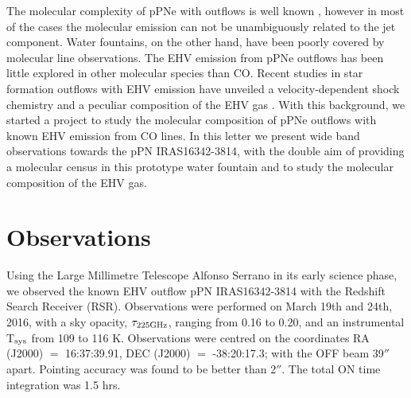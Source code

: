 \documentclass[a4paper,fleqn,usenatbib]{mnras}
\begin{document}
The molecular complexity of pPNe with outflows is well known \citep[e.g.][]{Sanchez97}, however in most of the cases the molecular emission can not be unambiguously related to the jet component. Water fountains, on the other hand, have been poorly covered by molecular line observations. The EHV emission from pPNe outflows has been little explored in other molecular species than CO. Recent studies in star formation outflows with EHV emission have unveiled a velocity-dependent shock chemistry and a peculiar composition of the EHV gas \citep{Tafalla10}. With this background, we started a project to study the molecular composition of pPNe outflows with known EHV emission from CO lines. In this letter we present wide band observations towards the pPN IRAS16342-3814, with the double aim of providing a molecular census in this prototype water fountain and to study the molecular composition of the EHV gas. 

\section{Observations}
Using the Large Millimetre Telescope Alfonso Serrano in its early science phase, we observed the known EHV outflow pPN IRAS16342-3814 with the Redshift Search Receiver (RSR). Observations were performed on March 19th and 24th, 2016, with a sky opacity, $\tau_{\rm 225 GHz}$, ranging from 0.16 to 0.20, and an instrumental T$_{\rm sys}$ from 109 to 116 K. Observations were centred on the coordinates RA (J2000) $=$ 16:37:39.91, DEC (J2000) $=$ -38:20:17.3; with the OFF beam 39$''$ apart. Pointing accuracy was found to be better than 2$''$. The total ON time integration was 1.5 hrs. 
\end{document}
